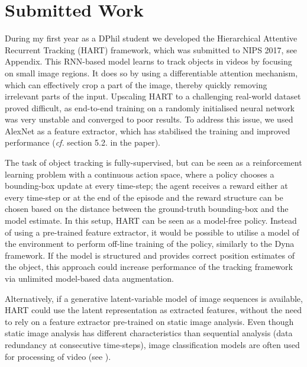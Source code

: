 \section{Submitted Work}
\label{sec:done}

    During my first year as a DPhil student we developed the Hierarchical Attentive Recurrent Tracking (HART) framework, which was submitted to NIPS 2017, see Appendix. 
    This RNN-based model learns to track objects in videos by focusing on small image regions. It does so by using a differentiable attention mechanism, which can effectively crop a part of the image, thereby quickly removing irrelevant parts of the input.
    Upscaling HART to a challenging real-world dataset proved difficult, as end-to-end training on a randomly initialised neural network was very unstable and converged to poor results. 
    To address this issue, we used AlexNet \citep{Krizhevsky2012} as a feature extractor, which has stabilised the training and improved performance (\emph{cf.} section 5.2. in the paper).
    
    The task of object tracking is fully-supervised, but can be seen as a reinforcement learning problem \citep{Zhang2017a} with a continuous action space, where a policy chooses a bounding-box update at every time-step; the agent receives a reward either at every time-step or at the end of the episode and the reward structure can be chosen based on the distance between the ground-truth bounding-box and the model estimate. In this setup, HART can be seen as a model-free policy. Instead of using a pre-trained feature extractor, it would be possible to utilise a model of the environment to perform off-line training of the policy, similarly to the Dyna framework. If the model is structured and provides correct position estimates of the object, this approach could increase performance of the tracking framework via unlimited model-based data augmentation.
    
    Alternatively, if a generative latent-variable model of image sequences is available, HART could use the latent representation as extracted features, without the need to rely on a feature extractor pre-trained on static image analysis. Even though static image analysis has different characteristics than sequential analysis (\eg data redundancy at consecutive time-steps), image classification models are often used for processing of video (see \eg \cite{Ning2016a}). 
    
